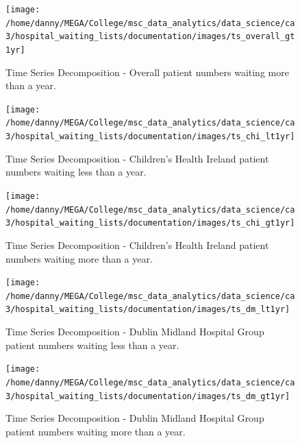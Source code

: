 \documentclass[
  12pt,
]{article}
\begin{document}
\begin{figure}

{\centering \texttt{[image: /home/danny/MEGA/College/msc\_data\_analytics/data\_science/ca3/hospital\_waiting\_lists/documentation/images/ts\_overall\_gt1yr]} 

}

\caption{Time Series Decomposition - Overall patient numbers waiting more than a year.}\label{fig:ts-overall-gt1yr}
\end{figure}

\begin{figure}

{\centering \texttt{[image: /home/danny/MEGA/College/msc\_data\_analytics/data\_science/ca3/hospital\_waiting\_lists/documentation/images/ts\_chi\_lt1yr]} 

}

\caption{Time Series Decomposition - Children's Health Ireland patient numbers waiting less than a year.}\label{fig:ts-chi-lt1yr}
\end{figure}

\begin{figure}

{\centering \texttt{[image: /home/danny/MEGA/College/msc\_data\_analytics/data\_science/ca3/hospital\_waiting\_lists/documentation/images/ts\_chi\_gt1yr]} 

}

\caption{Time Series Decomposition - Children's Health Ireland patient numbers waiting more than a year.}\label{fig:ts-chi-gt1yr}
\end{figure}

\begin{figure}

{\centering \texttt{[image: /home/danny/MEGA/College/msc\_data\_analytics/data\_science/ca3/hospital\_waiting\_lists/documentation/images/ts\_dm\_lt1yr]} 

}

\caption{Time Series Decomposition - Dublin Midland Hospital Group patient numbers waiting less than a year.}\label{fig:ts-dm-lt1yr}
\end{figure}

\begin{figure}

{\centering \texttt{[image: /home/danny/MEGA/College/msc\_data\_analytics/data\_science/ca3/hospital\_waiting\_lists/documentation/images/ts\_dm\_gt1yr]} 

}

\caption{Time Series Decomposition - Dublin Midland Hospital Group patient numbers waiting more than a year.}\label{fig:ts-dm-gt1yr}
\end{figure}
\end{document}
